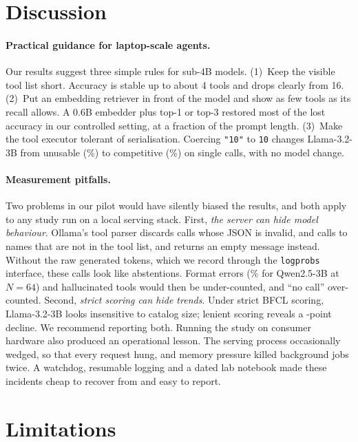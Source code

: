 \section{Discussion}
\label{sec:discussion}

\paragraph{Practical guidance for laptop-scale agents.}
Our results suggest three simple rules for sub-4B models.
(1)~Keep the visible tool list short. Accuracy is stable up to about 4 tools and drops clearly from 16.
(2)~Put an embedding retriever in front of the model and show as few tools as its recall allows. A 0.6B embedder plus top-1 or top-3 restored most of the lost accuracy in our controlled setting, at a fraction of the prompt length.
(3)~Make the tool executor tolerant of serialisation. Coercing \texttt{"10"} to \texttt{10} changes Llama-3.2-3B from unusable (\AccLlamaNOne\%) to competitive (\LenLlamaNOne\%) on single calls, with no model change.

\paragraph{Measurement pitfalls.}
Two problems in our pilot would have silently biased the results, and both apply to any study run on a local serving stack.
First, \emph{the server can hide model behaviour}. Ollama's tool parser discards calls whose JSON is invalid, and calls to names that are not in the tool list, and returns an empty message instead. Without the raw generated tokens, which we record through the \texttt{logprobs} interface, these calls look like abstentions. Format errors (\FailFormatQwenThreeNSixtyFour\% for Qwen2.5-3B at $N{=}64$) and hallucinated tools would then be under-counted, and ``no call'' over-counted.
Second, \emph{strict scoring can hide trends}. Under strict BFCL scoring, Llama-3.2-3B looks insensitive to catalog size; lenient scoring reveals a \LenDropLlama-point decline. We recommend reporting both.
Running the study on consumer hardware also produced an operational lesson. The serving process occasionally wedged, so that every request hung, and memory pressure killed background jobs twice. A watchdog, resumable logging and a dated lab notebook made these incidents cheap to recover from and easy to report.

\section{Limitations}
\label{sec:limitations}


